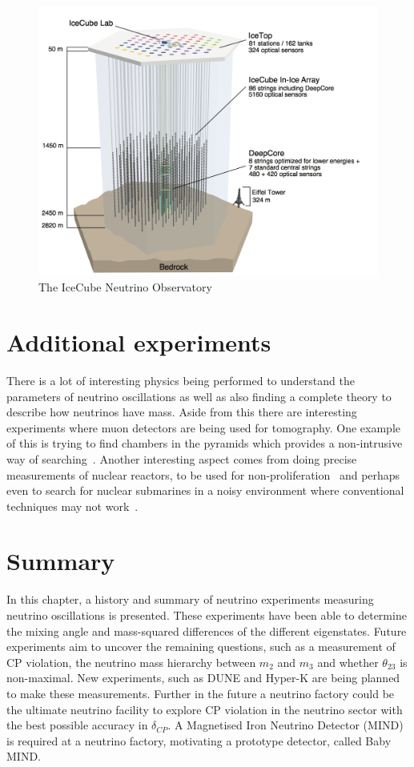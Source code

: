 \begin{figure}
\centering
\includegraphics[width=.5\textwidth]{figures/IceCube.jpeg}
\caption{The IceCube Neutrino Observatory}
\end{figure}
\fi

\section{Additional experiments}

There is a lot of interesting physics being performed to understand the parameters of neutrino oscillations as well as also finding a complete theory to describe how neutrinos have mass. Aside from this there are interesting experiments where muon detectors are being used for tomography. One example of this is trying to find chambers in the pyramids which provides a non-intrusive way of searching~\cite{86Morishima}. Another interesting aspect comes from doing precise measurements of nuclear reactors, to be used for non-proliferation~\cite{87Askins} and perhaps even to search for nuclear submarines in a noisy environment where conventional techniques may not work~\cite{88Jocher}.


\section{Summary}

In this chapter, a history and summary of neutrino experiments measuring neutrino oscillations is presented. These experiments have been able to determine the mixing angle and mass-squared differences of the different eigenstates. Future experiments aim to uncover the remaining questions, such as a measurement of CP violation, the neutrino mass hierarchy between $m_2$ and $m_3$ and whether $\theta_{23}$ is non-maximal. New experiments, such as DUNE and Hyper-K are being planned to make these measurements. Further in the future a neutrino factory could be the ultimate neutrino facility to explore CP violation in the neutrino sector with the best possible accuracy in $\delta_{CP}$. A Magnetised Iron Neutrino Detector (MIND) is required at a neutrino factory, motivating a prototype detector, called Baby MIND. 






